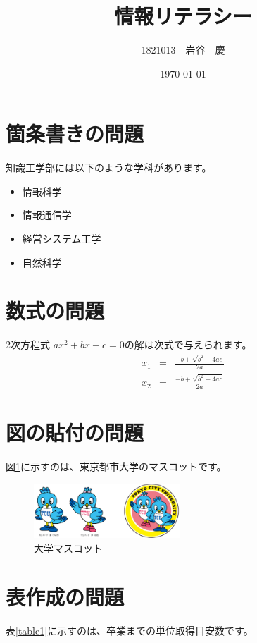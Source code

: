 \documentclass[11pt,a4j,twocolumn]{jarticle}
\title{情報リテラシー}
\author{1821013　岩谷　慶}
\date{\today}
\begin{document}
\maketitle
\section{箇条書きの問題}

知識工学部には以下のような学科があります。
\begin{itemize}
\item 情報科学
\item 情報通信学
\item 経営システム工学
\item 自然科学
\end{itemize}

\section{数式の問題}
2次方程式 $ ax^{2}+bx+c=0 $の解は次式で与えられます。
\begin{eqnarray}
  x_{1} & = & \frac{-b + \sqrt{b^2 - 4ac}}{2a} \\
  x_{2} & = & \frac{-b + \sqrt{b^2 - 4ac}}{2a}
\end{eqnarray}


\section{図の貼付の問題}

図\ref{figure1}に示すのは、東京都市大学のマスコットです。
\begin{figure}[t]
\begin{center}
\includegraphics[width=55mm]{mascot.eps}
\end{center}
\caption{大学マスコット}
\label{figure1}
\end{figure}


\section{表作成の問題}
表\ref{table1}に示すのは、卒業までの単位取得目安数です。
\end{document}
